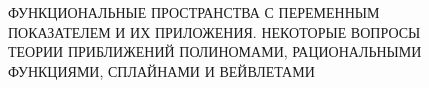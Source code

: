  \begin{center}
 {\large

ФУНКЦИОНАЛЬНЫЕ ПРОСТРАНСТВА С ПЕРЕМЕННЫМ \\[4pt]
ПОКАЗАТЕЛЕМ И ИХ ПРИЛОЖЕНИЯ. НЕКОТОРЫЕ ВОПРОСЫ \\[4pt]
ТЕОРИИ ПРИБЛИЖЕНИЙ ПОЛИНОМАМИ, РАЦИОНАЛЬНЫМИ\\[4pt]
ФУНКЦИЯМИ, СПЛАЙНАМИ И ВЕЙВЛЕТАМИ
 }
 \\[12pt]
\end{center}
